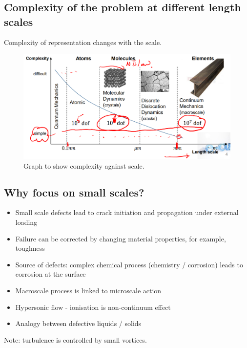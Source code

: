 \subsection{Complexity of the problem at different length scales}
Complexity of representation changes with the scale.
\begin{figure}[H]
	\centering
	\includegraphics[width = \textwidth]{./img/figure2.png}
	\caption{Graph to show complexity against scale.}
\end{figure}
\subsection{Why focus on small scales?}
\begin{itemize}
	\item Small scale defects lead to crack initiation and propagation under external loading
	\item Failure can be corrected by changing material properties, for example, toughness
	\item Source of defects: complex chemical process (chemistry / corrosion) leads to corrosion at the surface
	\item Macroscale process is linked to microscale action
	\item Hypersonic flow - ionisation is non-continuum effect
	\item Analogy between defective liquids / solids
\end{itemize}
Note: turbulence is controlled by small vortices.
